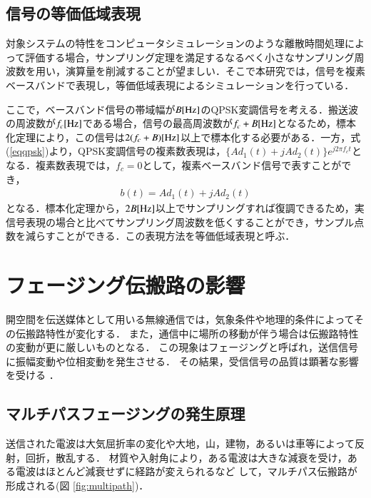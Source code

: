 \subsection{信号の等価低域表現}
対象システムの特性をコンピュータシミュレーションのような離散時間処理によって評価する場合，サンプリング定理を満足するなるべく小さなサンプリング周波数を用い，演算量を削減することが望ましい．そこで本研究では，信号を複素ベースバンドで表現し，等価低域表現によるシミュレーションを行っている．

ここで，ベースバンド信号の帯域幅が$B[{\rm Hz}]$のQPSK変調信号を考える．搬送波の周波数が$f_c[{\rm Hz}]$である場合，信号の最高周波数が$f_c+B[{\rm Hz}]$となるため，標本化定理により，この信号は$2(f_c+B)[{\rm Hz}]$以上で標本化する必要がある．一方，式(\ref{eqqpsk})より，QPSK変調信号の複素数表現は，$\{Ad_1(t)+jAd_2(t)\}e^{j2\pi f_ct}$となる．複素数表現では，$f_c=0$として，複素ベースバンド信号で表すことができ，
\begin{eqnarray}
b(t)=Ad_1(t)+jAd_2(t)
\end{eqnarray}
となる．標本化定理から，$2B[{\rm Hz}]$以上でサンプリングすれば復調できるため，実信号表現の場合と比べてサンプリング周波数を低くすることができ，サンプル点数を減らすことができる．この表現方法を等価低域表現と呼ぶ\cite{takahata}．

\section{フェージング伝搬路の影響}
開空間を伝送媒体として用いる無線通信では，気象条件や地理的条件によってその伝搬路特性が変化する．
また，通信中に場所の移動が伴う場合は伝搬路特性の変動が更に厳しいものとなる．
この現象はフェージングと呼ばれ，送信信号に振幅変動や位相変動を発生させる．
その結果，受信信号の品質は顕著な影響を受ける \cite{saitou}．

\subsection{マルチパスフェージングの発生原理}
送信された電波は大気屈折率の変化や大地，山，建物，あるいは車等によって反射，回折，散乱する．
材質や入射角により，ある電波は大きな減衰を受け，ある電波はほとんど減衰せずに経路が変えられるなど
して，マルチパス伝搬路が形成される(図 \ref{fig:multipath})．

